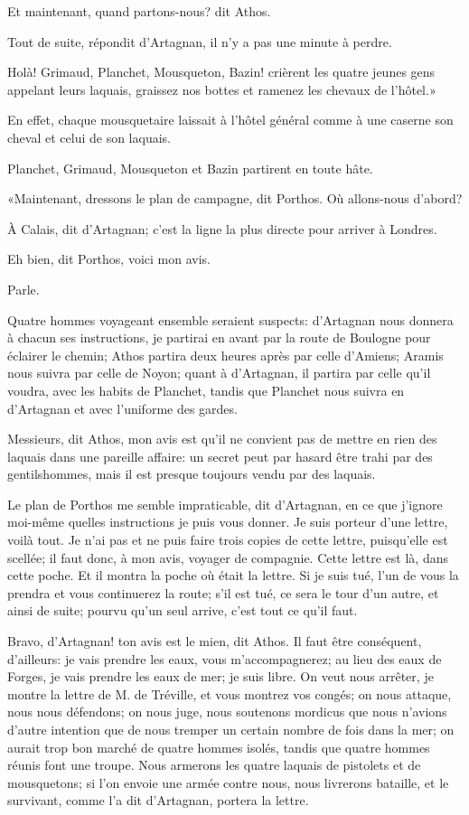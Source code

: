 \speak  Et maintenant, quand partons-nous? dit Athos. 

\speak  Tout de suite, répondit d'Artagnan, il n'y a pas une minute à perdre. 

\speak  Holà! Grimaud, Planchet, Mousqueton, Bazin! crièrent les quatre jeunes gens appelant leurs laquais, graissez nos bottes et ramenez les chevaux de l'hôtel.» 

En effet, chaque mousquetaire laissait à l'hôtel général comme à une caserne son cheval et celui de son laquais. 

Planchet, Grimaud, Mousqueton et Bazin partirent en toute hâte. 

«Maintenant, dressons le plan de campagne, dit Porthos. Où allons-nous d'abord? 

\speak  À Calais, dit d'Artagnan; c'est la ligne la plus directe pour arriver à Londres. 

\speak  Eh bien, dit Porthos, voici mon avis. 

\speak  Parle. 

\speak  Quatre hommes voyageant ensemble seraient suspects: d'Artagnan nous donnera à chacun ses instructions, je partirai en avant par la route de Boulogne pour éclairer le chemin; Athos partira deux heures après par celle d'Amiens; Aramis nous suivra par celle de Noyon; quant à d'Artagnan, il partira par celle qu'il voudra, avec les habits de Planchet, tandis que Planchet nous suivra en d'Artagnan et avec l'uniforme des gardes. 

\speak  Messieurs, dit Athos, mon avis est qu'il ne convient pas de mettre en rien des laquais dans une pareille affaire: un secret peut par hasard être trahi par des gentilshommes, mais il est presque toujours vendu par des laquais. 

\speak  Le plan de Porthos me semble impraticable, dit d'Artagnan, en ce que j'ignore moi-même quelles instructions je puis vous donner. Je suis porteur d'une lettre, voilà tout. Je n'ai pas et ne puis faire trois copies de cette lettre, puisqu'elle est scellée; il faut donc, à mon avis, voyager de compagnie. Cette lettre est là, dans cette poche. Et il montra la poche où était la lettre. Si je suis tué, l'un de vous la prendra et vous continuerez la route; s'il est tué, ce sera le tour d'un autre, et ainsi de suite; pourvu qu'un seul arrive, c'est tout ce qu'il faut. 

\speak  Bravo, d'Artagnan! ton avis est le mien, dit Athos. Il faut être conséquent, d'ailleurs: je vais prendre les eaux, vous m'accompagnerez; au lieu des eaux de Forges, je vais prendre les eaux de mer; je suis libre. On veut nous arrêter, je montre la lettre de M. de Tréville, et vous montrez vos congés; on nous attaque, nous nous défendons; on nous juge, nous soutenons mordicus que nous n'avions d'autre intention que de nous tremper un certain nombre de fois dans la mer; on aurait trop bon marché de quatre hommes isolés, tandis que quatre hommes réunis font une troupe. Nous armerons les quatre laquais de pistolets et de mousquetons; si l'on envoie une armée contre nous, nous livrerons bataille, et le survivant, comme l'a dit d'Artagnan, portera la lettre. 

